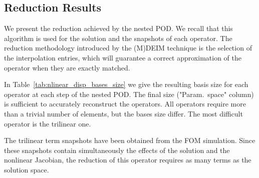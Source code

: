 \documentclass[../../thesis.tex]{subfiles}
\begin{document}

\subsection{Reduction Results}
We present the reduction achieved by the nested POD.
We recall that this algorithm is used for the solution and the snapshots of each operator.
The reduction methodology introduced by the (M)DEIM technique 
is the selection of the interpolation entries, 
which will guarantee a correct approximation of the operator when they are exactly matched.

In Table~\ref{tab:nlinear_disp_bases_size} we give the resulting basis size 
for each operator at each step of the nested POD.
The final size (\mbox{"Param. space"} column) is sufficient to accurately reconstruct the operators.
All operators require more than a trivial number of elements, 
but the bases size differ.
The most difficult operator is the trilinear one.

The trilinear term snapshots have been obtained from the FOM simulation.
Since these snapshots contain simultaneously 
the effects of the solution 
and the nonlinear Jacobian,
the reduction of this operator requires as many terms as the solution space.
\end{document}
